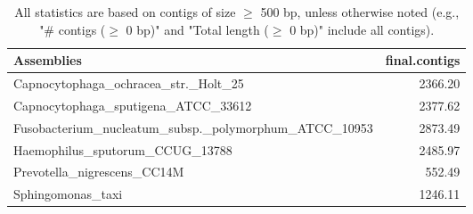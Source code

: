 \documentclass[12pt,a4paper]{article}
\begin{document}
\begin{table}[ht]
\begin{center}
\caption{All statistics are based on contigs of size $\geq$ 500 bp, unless otherwise noted (e.g., "\# contigs ($\geq$ 0 bp)" and "Total length ($\geq$ 0 bp)" include all contigs).}
\begin{tabular}{|l*{1}{|r}|}
\hline
Assemblies & final.contigs \\ \hline
Capnocytophaga\_ochracea\_str.\_Holt\_25 & 2366.20 \\ \hline
Capnocytophaga\_sputigena\_ATCC\_33612 & 2377.62 \\ \hline
Fusobacterium\_nucleatum\_subsp.\_polymorphum\_ATCC\_10953 & 2873.49 \\ \hline
Haemophilus\_sputorum\_CCUG\_13788 & 2485.97 \\ \hline
Prevotella\_nigrescens\_CC14M & 552.49 \\ \hline
Sphingomonas\_taxi & 1246.11 \\ \hline
\end{tabular}
\end{center}
\end{table}
\end{document}
